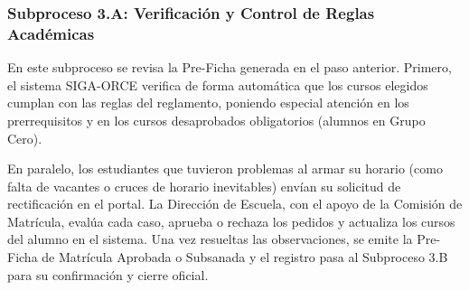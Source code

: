 \subsubsection{Subproceso 3.A: Verificación y Control de Reglas Académicas}

En este subproceso se revisa la Pre-Ficha generada en el paso anterior. Primero, el sistema SIGA-ORCE verifica de forma automática que los cursos elegidos cumplan con las reglas del reglamento, poniendo especial atención en los prerrequisitos y en los cursos desaprobados obligatorios (alumnos en Grupo Cero).

En paralelo, los estudiantes que tuvieron problemas al armar su horario (como falta de vacantes o cruces de horario inevitables) envían su solicitud de rectificación en el portal. La Dirección de Escuela, con el apoyo de la Comisión de Matrícula, evalúa cada caso, aprueba o rechaza los pedidos y actualiza los cursos del alumno en el sistema. Una vez resueltas las observaciones, se emite la Pre-Ficha de Matrícula Aprobada o Subsanada y el registro pasa al Subproceso 3.B para su confirmación y cierre oficial.
